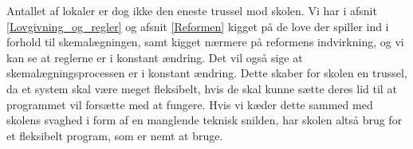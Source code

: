Antallet af lokaler er dog ikke den eneste trussel mod skolen. Vi har i afsnit \ref{Lovgivning_og_regler} og afsnit \ref{Reformen} kigget på de love der spiller ind i forhold til skemalægningen, samt kigget nærmere på reformens indvirkning, og vi kan se at reglerne er i konstant ændring. Det vil også sige at skemalægningsprocessen er i konstant ændring. Dette skaber for skolen en trussel, da et system skal være meget fleksibelt, hvis de skal kunne sætte deres lid til at programmet vil forsætte med at fungere. Hvis vi kæder dette sammed med skolens svaghed i form af en manglende teknisk snilden, har skolen altså brug for et fleksibelt program, som er nemt at bruge.
